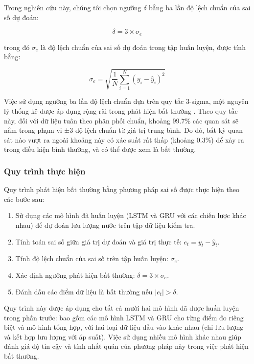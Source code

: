 Trong nghiên cứu này, chúng tôi chọn ngưỡng \(\delta\) bằng ba lần độ lệch chuẩn của sai số dự đoán:

\begin{equation}
\delta = 3 \times \sigma_e
\end{equation}

trong đó \(\sigma_e\) là độ lệch chuẩn của sai số dự đoán trong tập huấn luyện, được tính bằng:

\begin{equation}
\sigma_e = \sqrt{\frac{1}{N} \sum_{i=1}^{N} (y_i - \hat{y}_i)^2}
\end{equation}

Việc sử dụng ngưỡng ba lần độ lệch chuẩn dựa trên quy tắc 3-sigma, một nguyên lý thống kê được áp dụng rộng rãi trong phát hiện bất thường \cite{malhotra2016lstm, hundman2018detecting}. Theo quy tắc này, đối với dữ liệu tuân theo phân phối chuẩn, khoảng 99.7\% các quan sát sẽ nằm trong phạm vi ±3 độ lệch chuẩn từ giá trị trung bình. Do đó, bất kỳ quan sát nào vượt ra ngoài khoảng này có xác suất rất thấp (khoảng 0.3\%) để xảy ra trong điều kiện bình thường, và có thể được xem là bất thường.

\subsubsection{Quy trình thực hiện}
Quy trình phát hiện bất thường bằng phương pháp sai số được thực hiện theo các bước sau:

\begin{enumerate}
    \item Sử dụng các mô hình đã huấn luyện (LSTM và GRU với các chiến lược khác nhau) để dự đoán lưu lượng nước trên tập dữ liệu kiểm tra.
    \item Tính toán sai số giữa giá trị dự đoán và giá trị thực tế: \(e_t = y_t - \hat{y}_t\).
    \item Tính độ lệch chuẩn của sai số trên tập huấn luyện: \(\sigma_e\).
    \item Xác định ngưỡng phát hiện bất thường: \(\delta = 3 \times \sigma_e\).
    \item Đánh dấu các điểm dữ liệu là bất thường nếu \(|e_t| > \delta\).
\end{enumerate}

Quy trình này được áp dụng cho tất cả mười hai mô hình đã được huấn luyện trong phần trước: bao gồm các mô hình LSTM và GRU cho từng điểm đo riêng biệt và mô hình tổng hợp, với hai loại dữ liệu đầu vào khác nhau (chỉ lưu lượng và kết hợp lưu lượng với áp suất). Việc sử dụng nhiều mô hình khác nhau giúp đánh giá độ tin cậy và tính nhất quán của phương pháp này trong việc phát hiện bất thường.

